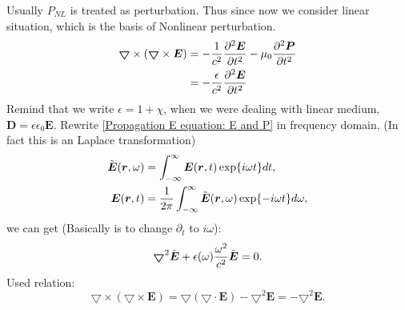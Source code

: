\documentclass[12pt]{extarticle}
\numberwithin{equation}{section}
\numberwithin{figure}{section}
\numberwithin{table}{section}
\newcommand{\<}{\langle}
\renewcommand{\>}{\rangle}
\theoremstyle{definition}
\newcommand{\Lap}{\boldsymbol{\bigtriangledown}}
\begin{document}
        
        Usually $P_{NL}$ is treated as perturbation. Thus since now we consider linear situation, which is the basis of Nonlinear perturbation.
            \begin{equation}
                \begin{split}
                    \Lap \times (\Lap\times\boldsymbol{E}) &= -\frac{1}{c^2}\pdv[2]{\boldsymbol{E}}{t}-\mu_0\pdv[2]{\boldsymbol{P}}{t}\\
                    &=-\frac{\epsilon}{c^2}\pdv[2]{\boldsymbol{E}}{t}
                \end{split}
                \label{Propagation E equation: E and P}
            \end{equation}
        Remind that we write $\epsilon = 1 + \chi$, when we were dealing with linear medium, $\boldsymbol{D} = \epsilon\epsilon_0\boldsymbol{E}$. Rewrite \autoref{Propagation E equation: E and P} in frequency domain, (In fact this is an Laplace transformation)
            \begin{subequations}
                \label{E in time domain and frequency domain}
                \begin{align}
                    \Tilde{\boldsymbol{E}}(\boldsymbol{r},\omega) &= \int_{-\infty}^{\infty} \boldsymbol{E}(\boldsymbol{r},t)\exp{i\omega t}dt\label{From E in time domain to E in freq domain},\\
                    \boldsymbol{E}(\boldsymbol{r},t) &=\frac{1}{2\pi} \int_{-\infty}^{\infty} \Tilde{\boldsymbol{E}}(\boldsymbol{r},\omega)\exp{-i\omega t}d\omega ,\label{From E in freq domain to E in time domain}
                \end{align}
            \end{subequations}
        we can get (Basically is to change $\partial_t$ to $i\omega$):
            \begin{equation}
                \Lap^2\Tilde{\boldsymbol{E}}+\epsilon(\omega)\frac{\omega^2}{c^2}\Tilde{\boldsymbol{E}}=0.
                \label{Propagation E equation in freq domain}
            \end{equation}
        Used relation:
            \begin{equation}
                \Lap\times(\Lap\times\boldsymbol{E})=\Lap(\Lap\cdot\boldsymbol{E})-\Lap^2\boldsymbol{E}=-\Lap^2\boldsymbol{E}.
                \label{double crossing laplace relation}
            \end{equation}
\end{document}
